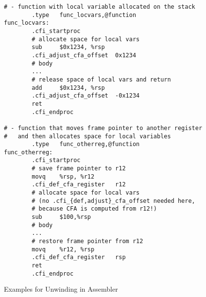 \begin{figure}[H]
\Hrule
\caption{Examples for Unwinding in Assembler}
\label{fig_asm_unwinding}
\begin{center}
\begin{small}
\begin{verbatim}
# - function with local variable allocated on the stack
        .type   func_locvars,@function
func_locvars:
        .cfi_startproc
        # allocate space for local vars
        sub     $0x1234, %rsp
        .cfi_adjust_cfa_offset  0x1234
        # body
        ...
        # release space of local vars and return
        add     $0x1234, %rsp
        .cfi_adjust_cfa_offset  -0x1234
        ret
        .cfi_endproc

# - function that moves frame pointer to another register
#   and then allocates space for local variables
        .type   func_otherreg,@function
func_otherreg:
        .cfi_startproc
        # save frame pointer to r12
        movq    %rsp, %r12
        .cfi_def_cfa_register   r12
        # allocate space for local vars 
        # (no .cfi_{def,adjust}_cfa_offset needed here, 
        # because CFA is computed from r12!)
        sub     $100,%rsp
        # body
        ...
        # restore frame pointer from r12
        movq    %r12, %rsp
        .cfi_def_cfa_register   rsp
        ret
        .cfi_endproc
\end{verbatim}
\end{small}
\end{center}
\Hrule
\end{figure}

